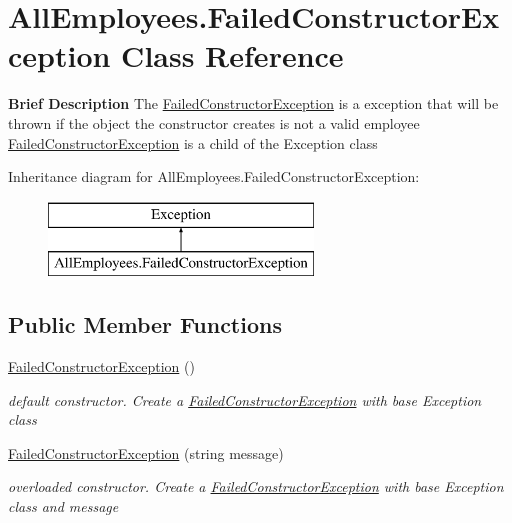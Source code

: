 \hypertarget{class_all_employees_1_1_failed_constructor_exception}{}\section{All\+Employees.\+Failed\+Constructor\+Exception Class Reference}
\label{class_all_employees_1_1_failed_constructor_exception}


{\bfseries Brief Description} The \hyperlink{class_all_employees_1_1_failed_constructor_exception}{Failed\+Constructor\+Exception} is a exception that will be thrown if the object the constructor creates is not a valid employee \hyperlink{class_all_employees_1_1_failed_constructor_exception}{Failed\+Constructor\+Exception} is a child of the Exception class  


Inheritance diagram for All\+Employees.\+Failed\+Constructor\+Exception\+:\begin{figure}[H]
\begin{center}
\leavevmode
\includegraphics[height=2.000000cm]{class_all_employees_1_1_failed_constructor_exception}
\end{center}
\end{figure}
\subsection*{Public Member Functions}
\begin{DoxyCompactItemize}
\item 
\hyperlink{class_all_employees_1_1_failed_constructor_exception_a78d117eff5ea056d0076b601274f382d}{Failed\+Constructor\+Exception} ()
\begin{DoxyCompactList}\small\item\em default constructor. Create a \hyperlink{class_all_employees_1_1_failed_constructor_exception}{Failed\+Constructor\+Exception} with base Exception class \end{DoxyCompactList}\item 
\hyperlink{class_all_employees_1_1_failed_constructor_exception_a41c940dd9d247e852c71b49788754e9f}{Failed\+Constructor\+Exception} (string message)
\begin{DoxyCompactList}\small\item\em overloaded constructor. Create a \hyperlink{class_all_employees_1_1_failed_constructor_exception}{Failed\+Constructor\+Exception} with base Exception class and message \end{DoxyCompactList}\end{DoxyCompactItemize}


